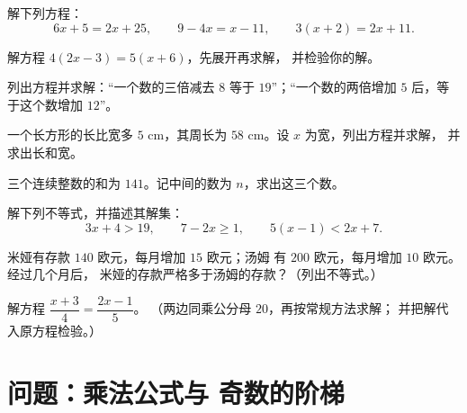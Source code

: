 \begin{exercise}[$\star$]\label{exo:g8:equations:5}
解下列方程：
\[
6x + 5 = 2x + 25, \qquad
9 - 4x = x - 11, \qquad
3(x + 2) = 2x + 11 .
\]
\end{exercise}

\begin{exercise}[$\star$]\label{exo:g8:equations:6}
解方程 $4(2x - 3) = 5(x + 6)$，先展开再求解，
并检验你的解。
\end{exercise}

\begin{exercise}[$\star$]\label{exo:g8:equations:7}
列出方程并求解：“一个数的三倍减去 $8$ 等于
$19$”；“一个数的两倍增加 $5$ 后，等于这个数增加
$12$”。
\end{exercise}

\begin{exercise}[$\star\star$]\label{exo:g8:equations:8}
一个长方形的长比宽多 $5$ cm，其周长为
$58$ cm。设 $x$ 为宽，列出方程并求解，
并求出长和宽。
\end{exercise}

\begin{exercise}[$\star\star$]\label{exo:g8:equations:9}
三个连续整数的和为 $141$。记中间的数为
$n$，求出这三个数。
\end{exercise}

\begin{exercise}[$\star\star$]\label{exo:g8:equations:10}
解下列不等式，并描述其解集：
\[
3x + 4 > 19, \qquad
7 - 2x \geq 1, \qquad
5(x - 1) < 2x + 7 .
\]
\end{exercise}

\begin{exercise}[$\star\star$]\label{exo:g8:equations:11}
米娅有存款 $140$ 欧元，每月增加 $15$ 欧元；汤姆
有 $200$ 欧元，每月增加 $10$ 欧元。经过几个月后，
米娅的存款严格多于汤姆的存款？（列出不等式。）
\end{exercise}

\begin{exercise}[$\star\star\star$]\label{exo:g8:equations:12}
解方程 $\dfrac{x + 3}{4} = \dfrac{2x - 1}{5}$。
（两边同乘公分母 $20$，再按常规方法求解；
并把解代入原方程检验。）
\end{exercise}

\section{问题：乘法公式与
奇数的阶梯}


